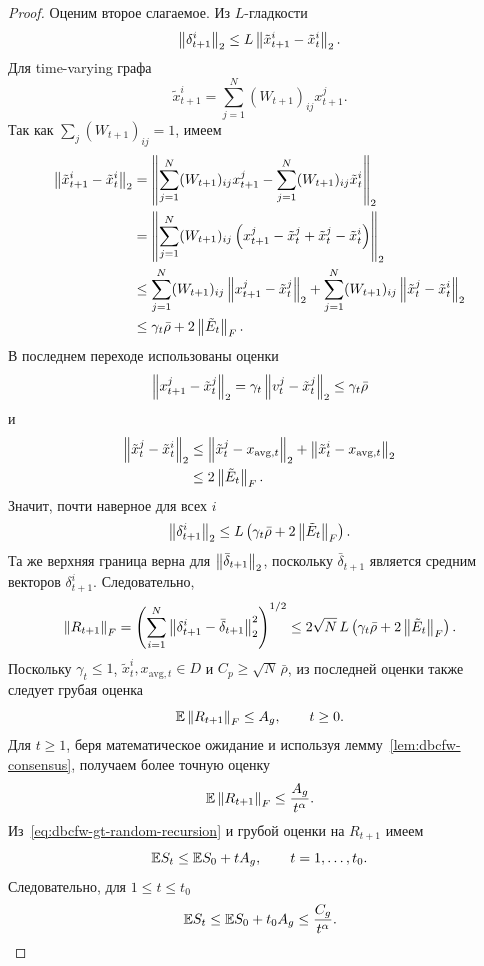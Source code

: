 \begin{proof}
Оценим второе слагаемое.
Из $L$-гладкости
\[
    \left\|\delta_{t+1}^i\right\|_2
    \leq
    L\left\|\tilde x_{t+1}^i-\tilde x_t^i\right\|_2.
\]
Для time-varying графа
\[
    \tilde x_{t+1}^i
    =
    \sum_{j=1}^N(W_{t+1})_{ij}x_{t+1}^j.
\]
Так как $\sum_j(W_{t+1})_{ij}=1$, имеем
\[
\begin{aligned}
    \left\|\tilde x_{t+1}^i-\tilde x_t^i\right\|_2
    &=
    \left\|
    \sum_{j=1}^N(W_{t+1})_{ij}x_{t+1}^j
    -
    \sum_{j=1}^N(W_{t+1})_{ij}\tilde x_t^i
    \right\|_2                                                   \\
    &=
    \left\|
    \sum_{j=1}^N(W_{t+1})_{ij}
    \left(x_{t+1}^j-\tilde x_t^j+\tilde x_t^j-\tilde x_t^i\right)
    \right\|_2                                                   \\
    &\leq
    \sum_{j=1}^N(W_{t+1})_{ij}
    \left\|x_{t+1}^j-\tilde x_t^j\right\|_2
    +
    \sum_{j=1}^N(W_{t+1})_{ij}
    \left\|\tilde x_t^j-\tilde x_t^i\right\|_2                                   \\
    &\leq
    \gamma_t\bar\rho+2\left\|\tilde E_t\right\|_F .
\end{aligned}
\]
В последнем переходе использованы оценки
\[
    \left\|x_{t+1}^j-\tilde x_t^j\right\|_2
    =
    \gamma_t\left\|v_t^j-\tilde x_t^j\right\|_2
    \leq
    \gamma_t\bar\rho
\]
и
\[
\begin{aligned}
    \left\|\tilde x_t^j-\tilde x_t^i\right\|_2
    &\leq
    \left\|\tilde x_t^j-x_{\mathrm{avg},t}\right\|_2
    +
    \left\|\tilde x_t^i-x_{\mathrm{avg},t}\right\|_2        \\
    &\leq
    2\left\|\tilde E_t\right\|_F .
\end{aligned}
\]
Значит, почти наверное для всех $i$
\[
    \left\|\delta_{t+1}^i\right\|_2
    \leq
    L\left(\gamma_t\bar\rho+2\left\|\tilde E_t\right\|_F\right).
\]
Та же верхняя граница верна для $\left\|\bar\delta_{t+1}\right\|_2$, поскольку
$\bar\delta_{t+1}$ является средним векторов $\delta_{t+1}^i$.
Следовательно,
\[
    \left\|R_{t+1}\right\|_F
    =
    \left(
        \sum_{i=1}^N
        \left\|\delta_{t+1}^i-\bar\delta_{t+1}\right\|_2^2
    \right)^{1/2}
    \leq
    2\sqrt N\,L\left(\gamma_t\bar\rho+2\left\|\tilde E_t\right\|_F\right).
\]
Поскольку $\gamma_t\leq1$, $\tilde x_t^i,x_{\mathrm{avg},t}\in D$ и
$C_p\geq\sqrt N\,\bar\rho$, из последней оценки также следует грубая оценка
\[
    \mathbb{E}\left\|R_{t+1}\right\|_F
    \leq
    A_g,
    \qquad
    t\geq0.
\]
Для $t\geq1$, беря математическое ожидание и используя
лемму~\ref{lem:dbcfw-consensus}, получаем более точную оценку
\[
    \mathbb{E}\left\|R_{t+1}\right\|_F
    \leq
    \frac{A_g}{t^\alpha}.
\]
Из~\eqref{eq:dbcfw-gt-random-recursion} и грубой оценки на $R_{t+1}$ имеем
\[
    \mathbb{E} S_t
    \leq
    \mathbb{E} S_0+tA_g,
    \qquad
    t=1,\ldots,t_0.
\]
Следовательно, для $1\leq t\leq t_0$
\[
    \mathbb{E} S_t
    \leq
    \mathbb{E} S_0+t_0A_g
    \leq
    \frac{C_g}{t^\alpha}.
\]


\end{proof}
